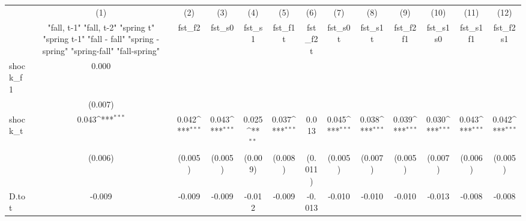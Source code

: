 {
\def\sym#1{\ifmmode^{#1}\else\(^{#1}\)\fi}
\begin{tabular}{l*{12}{c}}
\toprule
            &\multicolumn{1}{c}{(1)}&\multicolumn{1}{c}{(2)}&\multicolumn{1}{c}{(3)}&\multicolumn{1}{c}{(4)}&\multicolumn{1}{c}{(5)}&\multicolumn{1}{c}{(6)}&\multicolumn{1}{c}{(7)}&\multicolumn{1}{c}{(8)}&\multicolumn{1}{c}{(9)}&\multicolumn{1}{c}{(10)}&\multicolumn{1}{c}{(11)}&\multicolumn{1}{c}{(12)}\\
            &\multicolumn{1}{c}{  "fall, t-1" "fall, t-2" "spring t" "spring t-1"  "fall - fall" "spring - spring" "spring-fall" "fall-spring" }&\multicolumn{1}{c}{fst\_f2}&\multicolumn{1}{c}{fst\_s0}&\multicolumn{1}{c}{fst\_s1}&\multicolumn{1}{c}{fst\_f1t}&\multicolumn{1}{c}{fst\_f2t}&\multicolumn{1}{c}{fst\_s0t}&\multicolumn{1}{c}{fst\_s1t}&\multicolumn{1}{c}{fst\_f2f1}&\multicolumn{1}{c}{fst\_s1s0}&\multicolumn{1}{c}{fst\_s1f1}&\multicolumn{1}{c}{fst\_f2s1}\\
\midrule
shock\_f1    &       0.000         &                     &                     &                     &                     &                     &                     &                     &                     &                     &                     &                     \\
            &     (0.007)         &                     &                     &                     &                     &                     &                     &                     &                     &                     &                     &                     \\
\addlinespace
shock\_t     &       0.043\sym{***}&       0.042\sym{***}&       0.043\sym{***}&       0.025\sym{**} &       0.037\sym{***}&       0.013         &       0.045\sym{***}&       0.038\sym{***}&       0.039\sym{***}&       0.030\sym{***}&       0.043\sym{***}&       0.042\sym{***}\\
            &     (0.006)         &     (0.005)         &     (0.005)         &     (0.009)         &     (0.008)         &     (0.011)         &     (0.005)         &     (0.007)         &     (0.005)         &     (0.007)         &     (0.006)         &     (0.005)         \\
\addlinespace
D.tot       &      -0.009         &      -0.009         &      -0.009         &      -0.012         &      -0.009         &      -0.013         &      -0.010         &      -0.010         &      -0.010         &      -0.013         &      -0.008         &      -0.008         \\

\end{tabular}}
